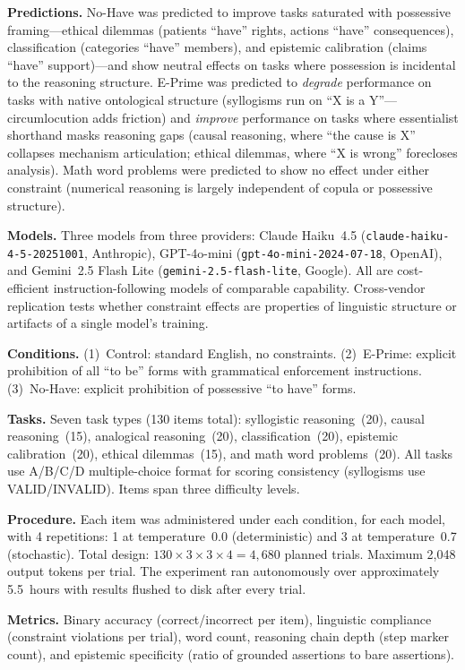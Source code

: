 \documentclass[11pt,a4paper]{article}
\begin{document}
\textbf{Predictions.} No-Have was predicted to improve tasks saturated with possessive framing---ethical dilemmas (patients ``have'' rights, actions ``have'' consequences), classification (categories ``have'' members), and epistemic calibration (claims ``have'' support)---and show neutral effects on tasks where possession is incidental to the reasoning structure. E-Prime was predicted to \emph{degrade} performance on tasks with native ontological structure (syllogisms run on ``X is a Y''---circumlocution adds friction) and \emph{improve} performance on tasks where essentialist shorthand masks reasoning gaps (causal reasoning, where ``the cause is X'' collapses mechanism articulation; ethical dilemmas, where ``X is wrong'' forecloses analysis). Math word problems were predicted to show no effect under either constraint (numerical reasoning is largely independent of copula or possessive structure).

\textbf{Models.} Three models from three providers: Claude Haiku~4.5 (\texttt{claude-haiku-4-5-20251001}, Anthropic), GPT-4o-mini (\texttt{gpt-4o-mini-2024-07-18}, OpenAI), and Gemini~2.5 Flash Lite (\texttt{gemini-2.5-flash-lite}, Google). All are cost-efficient instruction-following models of comparable capability. Cross-vendor replication tests whether constraint effects are properties of linguistic structure or artifacts of a single model's training.

\textbf{Conditions.} (1)~Control: standard English, no constraints. (2)~E-Prime: explicit prohibition of all ``to be'' forms with grammatical enforcement instructions. (3)~No-Have: explicit prohibition of possessive ``to have'' forms.

\textbf{Tasks.} Seven task types (130 items total): syllogistic reasoning~(20), causal reasoning~(15), analogical reasoning~(20), classification~(20), epistemic calibration~(20), ethical dilemmas~(15), and math word problems~(20). All tasks use A/B/C/D multiple-choice format for scoring consistency (syllogisms use VALID/INVALID). Items span three difficulty levels.

\textbf{Procedure.} Each item was administered under each condition, for each model, with 4 repetitions: 1 at temperature~0.0 (deterministic) and 3 at temperature~0.7 (stochastic). Total design: $130 \times 3 \times 3 \times 4 = 4{,}680$ planned trials. Maximum 2,048 output tokens per trial. The experiment ran autonomously over approximately 5.5~hours with results flushed to disk after every trial.

\textbf{Metrics.} Binary accuracy (correct/incorrect per item), linguistic compliance (constraint violations per trial), word count, reasoning chain depth (step marker count), and epistemic specificity (ratio of grounded assertions to bare assertions).
\end{document}
